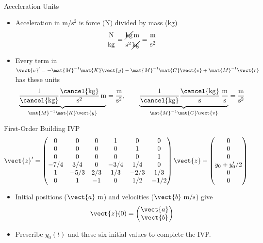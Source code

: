 \begin{frame}{Acceleration Units}
\begin{itemize}
  \item Acceleration in $\mathrm{m/s^2}$ is force ($\mathrm{N}$) divided by mass ($\mathrm{kg}$)
  \[
    \frac{\mathrm{N}}{\mathrm{kg}}
    =\frac{\cancel{\mathrm{kg}}\,\mathrm{m}}{\mathrm{s}^2\,\cancel{\mathrm{kg}}}
    =\frac{\mathrm{m}}{\mathrm{s}^2}
  \]
  \item Every term in $\vect{v}'=-\mat{M}^{-1}\mat{K}\vect{y}-\mat{M}^{-1}\mat{C}\vect{v}+\mat{M}^{-1}\vect{r}$ has these units
  \[
    \underbrace{\frac{1}{\cancel{\mathrm{kg}}}
      \frac{\cancel{\mathrm{kg}}}{\mathrm{s}^2}\,\mathrm{m}}
      _{\mat{M}^{-1}\mat{K}\vect{y}}
    =\frac{\mathrm{m}}{\mathrm{s}^2},\qquad
    \underbrace{\frac{1}{\cancel{\mathrm{kg}}}
      \frac{\cancel{\mathrm{kg}}}{\mathrm{s}}\,
      \frac{\mathrm{m}}{\mathrm{s}}}
      _{\mat{M}^{-1}\mat{C}\vect{v}}
    =\frac{\mathrm{m}}{\mathrm{s}^2}
  \]
\end{itemize}
\end{frame}
\begin{frame}{First-Order Building IVP}
\[
  \vect{z}'=
  \begin{pmatrix}
    0&0&0&1&0&0\\
    0&0&0&0&1&0\\
    0&0&0&0&0&1\\
    -7/4&3/4&0&-3/4&1/4&0\\
    1&-5/3&2/3&1/3&-2/3&1/3\\
    0&1&-1&0&1/2&-1/2
  \end{pmatrix}\vect{z}
  +\begin{pmatrix}0\\0\\0\\y_0+y_0'/2\\0\\0\end{pmatrix}
\]
\begin{itemize}
  \item Initial positions ($\vect{a}\ \mathrm{m}$) and velocities ($\vect{b}\ \mathrm{m/s}$) give
  \[
    \vect{z}(0)=\begin{pmatrix}\vect{a}\\\vect{b}\end{pmatrix}
  \]
  \item Prescribe $y_0(t)$ and these six initial values to complete the IVP.
\end{itemize}
\end{frame}
